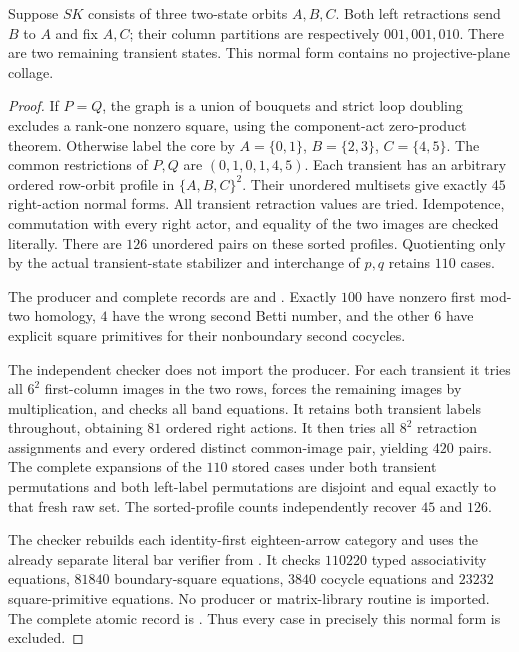 \begin{lemma}
\label{C:two-by-three-eight-state-control}
Suppose $SK$ consists of three two-state orbits $A,B,C$.
Both left retractions send $B$ to $A$ and fix $A,C$;
their column partitions are respectively $001,001,010$.
There are two remaining transient states.  This normal form
contains no projective-plane collage.
\end{lemma}
\begin{proof}
If $P=Q$, the graph is a union of bouquets and strict loop
doubling excludes a rank-one nonzero square, using the
component-act zero-product theorem.  Otherwise label the
core by $A=\{0,1\}$, $B=\{2,3\}$, $C=\{4,5\}$.
The common restrictions of $P,Q$ are
$(0,1,0,1,4,5)$.  Each transient has an arbitrary ordered
row-orbit profile in $\{A,B,C\}^2$.  Their unordered
multisets give exactly $45$ right-action normal forms.
All transient retraction values are tried.  Idempotence,
commutation with every right actor, and equality of the
two images are checked literally.  There are $126$ unordered
pairs on these sorted profiles.  Quotienting only by the
actual transient-state stabilizer and interchange of $p,q$
retains $110$ cases.

The producer and complete records are
 and
.
Exactly $100$ have nonzero first mod-two homology,
$4$ have the wrong second Betti number, and the other
$6$ have explicit square primitives for their nonboundary
second cocycles.

The independent checker
does not import the producer.  For each transient it
tries all $6^2$ first-column images in the two rows,
forces the remaining images by multiplication, and
checks all band equations.  It retains both transient
labels throughout, obtaining $81$ ordered right actions.
It then tries all $8^2$ retraction assignments and every
ordered distinct common-image pair, yielding $420$ pairs.
The complete expansions of the $110$ stored cases under
both transient permutations and both left-label permutations
are disjoint and equal exactly to that fresh raw set.
The sorted-profile counts independently recover $45$ and $126$.

The checker rebuilds each identity-first eighteen-arrow
category and uses the already separate literal bar verifier
from .  It checks
$110220$ typed associativity equations, $81840$ boundary-square
equations, $3840$ cocycle equations and $23232$ square-primitive
equations.  No producer or matrix-library routine is imported.
The complete atomic record is
.
Thus every case in precisely this normal form is excluded.
\end{proof}

